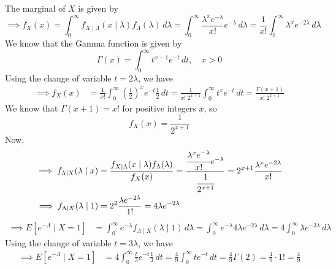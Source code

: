 The marginal of \( X \) is given by
\begin{equation*}
    \implies
    f_{X}(x)
    =
    \int_{0}^{\infty} f_{X \mid \Lambda}(x \mid \lambda) f_{\Lambda}(\lambda) \, d\lambda
    =
    \int_{0}^{\infty} \frac{\lambda^{x} e^{-\lambda}}{x!} e^{-\lambda} \, d\lambda
    =
    \frac{1}{x!} \int_{0}^{\infty} \lambda^{x} e^{-2\lambda} \, d\lambda
\end{equation*}
We know that the Gamma function is given by
\begin{equation*}
    \Gamma(x)
    =
    \int_{0}^{\infty} t^{x-1} e^{-t} \, dt,
    \quad x>0
\end{equation*}
Using the change of variable \( t=2\lambda \), we have
\begin{align*}
    \implies
    f_{X}(x)
     & =
    \frac{1}{x!} \int_{0}^{\infty} {\left(\frac{t}{2}\right)}^{x} e^{-t} \frac{1}{2} \, dt
    =
    \frac{1}{x! \; 2^{x+1}} \int_{0}^{\infty} t^{x} e^{-t} \, dt
    =
    \frac{\Gamma(x+1)}{x! \; 2^{x+1}}
\end{align*}
We know that \( \Gamma(x+1)=x! \) for positive integers \( x \), so
\begin{equation}
    f_{X}(x)
    =
    \frac{1}{2^{x+1}}
\end{equation}
Now,
\begin{align*}
    \implies
    f_{\Lambda \mid X}(\lambda \mid x)
     & =
    \frac{f_{X \mid \Lambda}(x \mid \lambda) f_{\Lambda}(\lambda)}{f_{X}(x)}
    =
    \frac{\cfrac{\lambda^{x} e^{-\lambda}}{x!} e^{-\lambda}}{\cfrac{1}{2^{x+1}}}
    =
    2^{x+1} \frac{\lambda^{x} e^{-2\lambda}}{x!}
    \\
    \implies
    f_{\Lambda \mid X}(\lambda \mid 1)
     & =
    2^{2} \frac{\lambda e^{-2\lambda}}{1!}
    =
    4 \lambda e^{-2\lambda}
\end{align*}
\begin{align*}
    \implies
    E\left[e^{-\Lambda} \mid X=1\right]
     & =
    \int_{0}^{\infty} e^{-\lambda} f_{\Lambda \mid X}(\lambda \mid 1) \, d\lambda
    =
    \int_{0}^{\infty} e^{-\lambda} 4 \lambda e^{-2\lambda} \, d\lambda
    =
    4 \int_{0}^{\infty} \lambda e^{-3\lambda} \, d\lambda
\end{align*}
Using the change of variable \( t=3\lambda \), we have
\begin{align*}
    \implies
    E\left[e^{-\Lambda} \mid X=1\right]
     & =
    4 \int_{0}^{\infty} \frac{t}{3} e^{-t} \frac{1}{3} \, dt
    =
    \frac{4}{9} \int_{0}^{\infty} t e^{-t} \, dt
    =
    \frac{4}{9} \Gamma(2)
    =
    \frac{4}{9} \cdot 1!
    =
    \boxed{
        \frac{4}{9}
    }
\end{align*}
